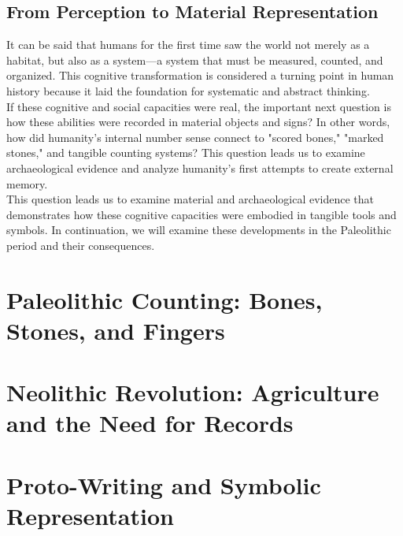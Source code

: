 \subsection{From Perception to Material Representation}

It can be said that humans for the first time saw the world not merely as a habitat, but also as a system—a system that must be measured, counted, and organized. This cognitive transformation is considered a turning point in human history because it laid the foundation for systematic and abstract thinking.\\
If these cognitive and social capacities were real, the important next question is how these abilities were recorded in material objects and signs? In other words, how did humanity's internal number sense connect to "scored bones," "marked stones," and tangible counting systems? This question leads us to examine archaeological evidence and analyze humanity's first attempts to create external memory.\\
This question leads us to examine material and archaeological evidence that demonstrates how these cognitive capacities were embodied in tangible tools and symbols. In continuation, we will examine these developments in the Paleolithic period and their consequences.

\section{Paleolithic Counting: Bones, Stones, and Fingers}

\section{Neolithic Revolution: Agriculture and the Need for Records}

\section{Proto-Writing and Symbolic Representation}
